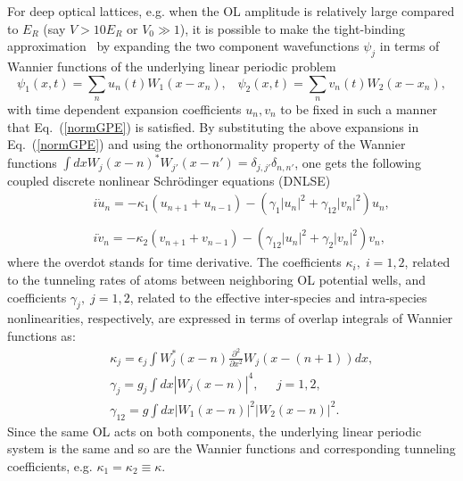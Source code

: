 \documentclass[12pt]{iopart}
\begin{document}
For deep optical lattices, e.g. when the OL amplitude is relatively large compared to $E_R$ (say $V > 10 E_R$ or  $V_0 \gg 1$), it is possible to make the tight-binding approximation~\cite{TS,ABKS} by expanding the two component wavefunctions $\psi_j$ in terms of Wannier functions of the underlying linear periodic problem~\cite{AKKS}
\begin{equation}
\psi_1(x,t)= \sum_n u_n(t) W_1(x-x_n),\;\;\; \psi_2(x,t)= \sum_n v_n(t) W_2(x-x_n),
\label{Wannexp}
\end{equation}
with time dependent expansion coefficients $u_n, v_n$ to be fixed in such a manner that Eq.~(\ref{normGPE}) is satisfied. By substituting the above expansions in Eq.~(\ref{normGPE}) and using the orthonormality property of the Wannier functions $\int dx W_{j}(x-n)^* W_{j'}(x-n')=\delta_{j,j'} \delta_{n,n'}$, one gets the following coupled discrete nonlinear Schr\"odinger  equations (DNLSE)~\cite{Shrestha}
\begin{eqnarray}
 && i\dot{u}_{n}=-\kappa_{1}(u_{n+1}+u_{n-1})-(\gamma_{1}|u_{n}|^{2}+\gamma_{12}|v_{n}|^{2})u_{n},\nonumber \\
\label{vdnlse}
\\
 && i\dot{v}_{n}=-\kappa_{2}(v_{n+1}+v_{n-1})-(\gamma_{12}|u_{n}|^{2}+\gamma_{2}|v_{n}|^{2})v_{n},\nonumber
 \end{eqnarray}
where the overdot stands for time derivative. The coefficients $\kappa_{i},\;i=1,2$, related to the tunneling rates of atoms between neighboring OL potential wells, and coefficients  $\gamma_{j},\;j=1,2$, related  to the effective inter-species and
intra-species nonlinearities, respectively, are expressed in terms of overlap integrals of Wannier functions as:
\begin{eqnarray}
& & \kappa_j = \epsilon_j \int W_{j}^*(x-n)\frac{\partial^2}{\partial x^2}W_{j}(x-(n+1)) dx, \nonumber \\
& & \gamma_{j}=
g_j \int dx |W_{j}(x-n)|^{4},\;\;\;\;\;j=1,2, \\
&  &
\gamma_{12}=
g \int dx|W_{1}(x-n)|^{2}|W_{2}(x-n)|^{2}. \nonumber
\end{eqnarray}
Since the same OL acts on both components, the underlying linear periodic system is the same and so are the Wannier functions and corresponding tunneling coefficients, e.g.  $\kappa_1=\kappa_2\equiv \kappa$.
\end{document}

